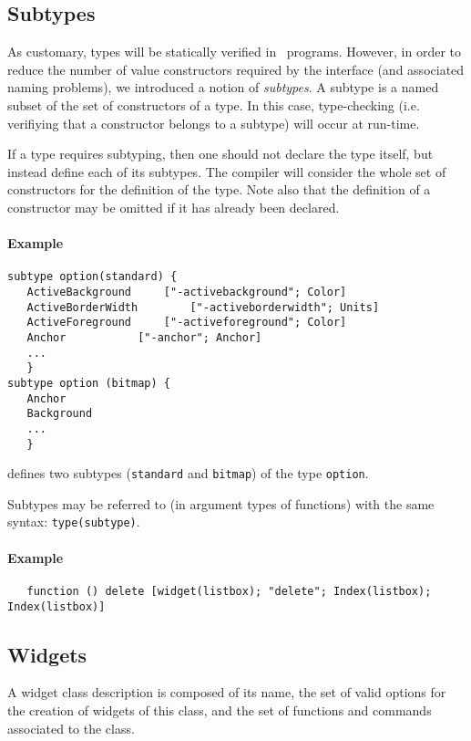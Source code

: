 \subsection{Subtypes}
As customary, types will be statically verified in \caml\ programs. However, in
order to reduce the number of value constructors required by the interface
(and associated naming problems),
we introduced a notion of {\em subtypes}. A subtype is a named subset of the
set of constructors of a type. In this case, type-checking (i.e. verifiying
that a constructor belongs to a subtype) will occur at run-time.

If a type requires subtyping, then one should not declare the type itself,
but instead define each of its subtypes. The compiler will consider the
whole set of constructors for the definition of the type. Note also that the
definition of a constructor may be omitted if it has  already been declared.

\paragraph{Example}
\begin{verbatim}
subtype option(standard) {
   ActiveBackground		["-activebackground"; Color]
   ActiveBorderWidth		["-activeborderwidth"; Units]
   ActiveForeground		["-activeforeground"; Color]
   Anchor			["-anchor"; Anchor]
   ...
   }
subtype option (bitmap) {
   Anchor
   Background
   ...
   }
\end{verbatim}
defines two subtypes (\verb|standard| and \verb|bitmap|) of the type
\verb|option|.

Subtypes may be referred to (in argument types of functions) with the same
syntax: \verb|type(subtype)|.
\paragraph{Example}
\begin{verbatim}
   function () delete [widget(listbox); "delete"; Index(listbox); Index(listbox)]
\end{verbatim} 

\subsection{Widgets}
A widget class description is composed of its name, the set of valid options
for the creation of widgets of this class, and the set of functions and
commands associated to the class.

